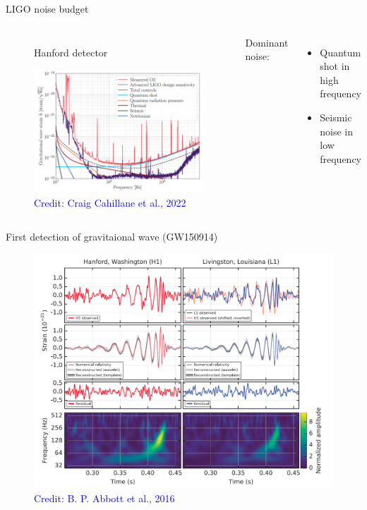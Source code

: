 \documentclass[pdf]{beamer}
\newcommand{\credit}[1]{\tiny{\textcolor{blue}{Credit: #1}}}
\begin{document}
\begin{frame}{LIGO noise budget}
\begin{columns}
\begin{figure}
\caption*{Hanford detector}
\includegraphics[scale=.17]{fig/noise-budget-ligo.png}
\caption*{\credit{Craig Cahillane et al., 2022}}
\end{figure}

Dominant noise:

\begin{itemize}
\item  
Quantum shot in high frequency

\item  
Seismic noise in low frequency
\end{itemize}

\end{columns}
\end{frame}

\begin{frame}{First detection of gravitaional wave (GW150914)}
\begin{figure}
\includegraphics[scale=.2]{fig/GW150914.png}
\caption*{\credit{B. P. Abbott et al., 2016}}
\end{figure}
\end{frame}
\end{document}
